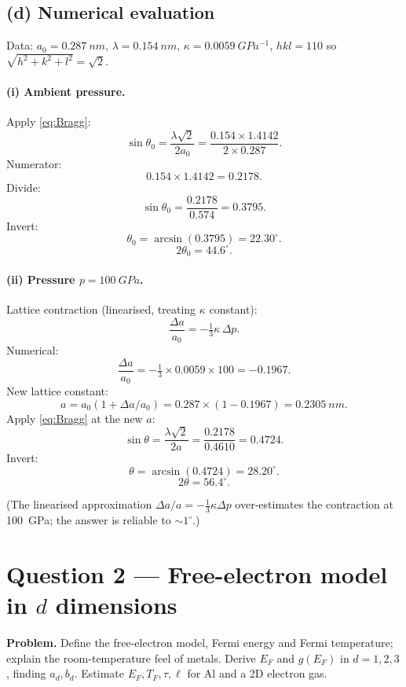 \documentclass[11pt]{article}
\begin{document}
\subsection*{(d) Numerical evaluation}

Data: $a_0 = \SI{0.287}{nm}$, $\lambda = \SI{0.154}{nm}$, $\kappa = \SI{0.0059}{GPa^{-1}}$, $hkl = 110$ so $\sqrt{h^2+k^2+l^2}=\sqrt 2$.

\paragraph{(i) Ambient pressure.}

Apply \eqref{eq:Bragg}:
\[
\sin\theta_0 = \frac{\lambda\sqrt{2}}{2a_0} = \frac{0.154\times 1.4142}{2\times 0.287}.
\]
Numerator:
\[
0.154\times 1.4142 = 0.2178.
\]
Divide:
\[
\sin\theta_0 = \frac{0.2178}{0.574} = 0.3795.
\]
Invert:
\[
\theta_0 = \arcsin(0.3795) = 22.30^\circ.
\]
\[
\boxed{\;2\theta_0 = 44.6^\circ.\;}
\]

\paragraph{(ii) Pressure $p = \SI{100}{GPa}$.}

Lattice contraction (linearised, treating $\kappa$ constant):
\[
\frac{\Delta a}{a_0} = -\tfrac{1}{3}\kappa\,\Delta p.
\]
Numerical:
\[
\frac{\Delta a}{a_0} = -\tfrac{1}{3}\times 0.0059\times 100 = -0.1967.
\]
New lattice constant:
\[
a = a_0(1+\Delta a/a_0) = 0.287\times(1-0.1967) = \SI{0.2305}{nm}.
\]
Apply \eqref{eq:Bragg} at the new $a$:
\[
\sin\theta = \frac{\lambda\sqrt 2}{2a} = \frac{0.2178}{0.4610} = 0.4724.
\]
Invert:
\[
\theta = \arcsin(0.4724) = 28.20^\circ.
\]
\[
\boxed{\;2\theta = 56.4^\circ.\;}
\]

(The linearised approximation $\Delta a/a = -\tfrac13\kappa\Delta p$ over-estimates the contraction at \SI{100}{GPa}; the answer is reliable to $\sim 1^\circ$.)

\section*{Question 2 --- Free-electron model in $d$ dimensions}

\textbf{Problem.} Define the free-electron model, Fermi energy and Fermi temperature; explain the room-temperature feel of metals. Derive $E_F$ and $g(E_F)$ in $d=1,2,3$, finding $a_d,b_d$. Estimate $E_F,T_F,\tau,\ell$ for Al and a 2D electron gas.
\end{document}
